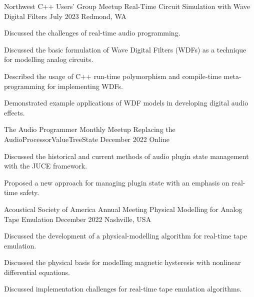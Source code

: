 

\begin{cventries}

  \cventry
    {Northwest C++ Users' Group Meetup} %
    {Real-Time Circuit Simulation with Wave Digital Filters} %
    {July 2023} %
    {Redmond, WA} %
    {
      \begin{cvitems} %
        \item {Discussed the challenges of real-time audio programming.}
        \item {Discussed the basic formulation of Wave Digital Filters (WDFs) as a technique for modelling analog circuits.}
        \item {Described the usage of C++ run-time polymorphism and compile-time meta-programming for implementing WDFs.}
        \item {Demonstrated example applications of WDF models in developing digital audio effects.}
      \end{cvitems}
    }

  \cventry
    {The Audio Programmer Monthly Meetup} %
    {Replacing the AudioProcessorValueTreeState} %
    {December 2022} %
    {Online} %
    {
      \begin{cvitems} %
        \item {Discussed the historical and current methods of audio plugin state management with the JUCE framework.}
        \item {Proposed a new approach for managing plugin state with an emphasis on real-time safety.}
      \end{cvitems}
    }


  \cventry
    {Acoustical Society of America Annual Meeting} %
    {Physical Modelling for Analog Tape Emulation} %
    {December 2022} %
    {Nashville, USA} %
    {
      \begin{cvitems} %
        \item {Discussed the development of a physical-modelling algorithm for real-time tape emulation.}
        \item {Discussed the physical basis for modelling magnetic hysteresis with nonlinear differential equations.}
        \item {Discussed implementation challenges for real-time tape emulation algorithms.}
      \end{cvitems}
    }


\end{cventries}
